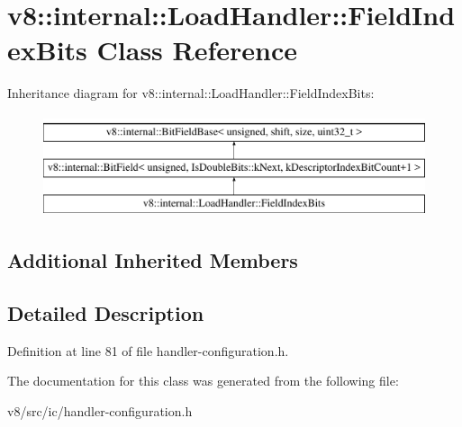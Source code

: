 \hypertarget{classv8_1_1internal_1_1LoadHandler_1_1FieldIndexBits}{}\section{v8\+:\+:internal\+:\+:Load\+Handler\+:\+:Field\+Index\+Bits Class Reference}
\label{classv8_1_1internal_1_1LoadHandler_1_1FieldIndexBits}
Inheritance diagram for v8\+:\+:internal\+:\+:Load\+Handler\+:\+:Field\+Index\+Bits\+:\begin{figure}[H]
\begin{center}
\leavevmode
\includegraphics[height=3.000000cm]{classv8_1_1internal_1_1LoadHandler_1_1FieldIndexBits}
\end{center}
\end{figure}
\subsection*{Additional Inherited Members}


\subsection{Detailed Description}


Definition at line 81 of file handler-\/configuration.\+h.



The documentation for this class was generated from the following file\+:\begin{DoxyCompactItemize}
\item 
v8/src/ic/handler-\/configuration.\+h\end{DoxyCompactItemize}
